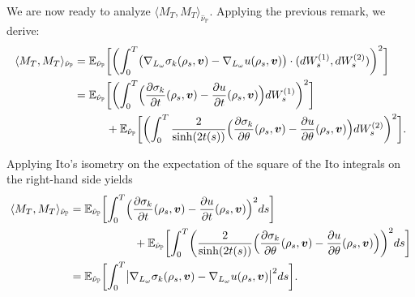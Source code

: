 \documentclass[10pt]{amsart}
\theoremstyle{plain}
\theoremstyle{definition}
\numberwithin{equation}{subsection}
\newcommand\bE{\mathbb{E}}
\newcommand\bP{\mathbb{P}}
\let\gradient\nabla
\newcommand{\bfv}{\boldsymbol{v}}
\newcommand{\bbE}[1]{\bE_{\hat{\nu}_\bP}\biggl[ #1 \biggr]}
\begin{document}
We are now ready to analyze $\langle M_T, M_T\rangle_{\hat{\nu}_\bP}$. Applying the previous remark, we derive:
\begin{align*}
\langle M_T, M_T\rangle_{\hat{\nu}_\bP} &= \bbE{\biggl(\int_0^T \bigl(\gradient_{L_\omega}\sigma_k(\rho_s,\bfv)-\gradient_{L_\omega}u(\rho_s,\bfv) \bigr) \cdot (dW^{(1)}_s,dW^{(2)}_s)\biggr)^2} \\
&= \bbE{\biggl(\int_0^T \Bigl(\frac{\partial \sigma_k}{\partial t}(\rho_s,\bfv)-\frac{\partial u}{\partial t}(\rho_s,\bfv) \Bigr) dW^{(1)}_s\biggr)^2}\\
&\hspace*{1cm}+ \bbE{\biggl(\int_0^T \frac{2}{\sinh(2t(s))} \Bigl(\frac{\partial \sigma_k}{\partial \theta}(\rho_s,\bfv)-\frac{\partial u}{\partial \theta}(\rho_s,\bfv) \Bigr) dW^{(2)}_s\biggr)^2}.
\end{align*}

Applying Ito's isometry on the expectation of the square of the Ito integrals on the right-hand side yields
\begin{align*}
\langle M_T, M_T\rangle_{\hat{\nu}_\bP} &= \bbE{\int_0^T \Bigl(\frac{\partial \sigma_k}{\partial t}(\rho_s,\bfv)- \frac{\partial u}{\partial t}(\rho_s,\bfv) \Bigr)^2 ds}\\
&\hspace*{2cm}+ \bbE{\int_0^T \biggl(\frac{2}{\sinh(2t(s))} \Bigl(\frac{\partial \sigma_k}{\partial \theta}(\rho_s,\bfv)- \frac{\partial u}{\partial \theta}(\rho_s,\bfv) \Bigr)\biggr)^2 ds} \\
&= \bbE{\int_0^T \bigl| \gradient_{L_\omega}\sigma_k(\rho_s,\bfv)-\gradient_{L_\omega}u(\rho_s,\bfv)\bigr|^2ds}.
\end{align*}
\end{document}
